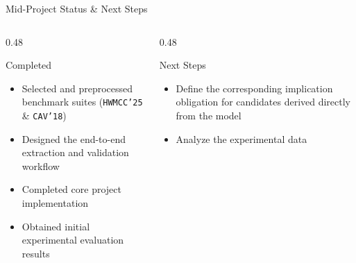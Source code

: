 \documentclass[aspectratio=169,xcolor=dvipsnames]{beamer}
\begin{document}
\begin{frame}{Mid-Project Status \& Next Steps}

  \begin{columns}[T,onlytextwidth]
    \begin{column}{0.48\textwidth}
      \begin{exampleblock}{Completed}
        \begin{itemize}
            \setlength\itemsep{0.4em}
          \item Selected and preprocessed benchmark suites (\texttt{HWMCC'25} \& \texttt{CAV'18})
          \item Designed the end-to-end extraction and validation workflow
          \item Completed core project implementation
          \item Obtained initial experimental evaluation results
        \end{itemize}
      \end{exampleblock}
    \end{column}

    \begin{column}{0.48\textwidth}
      \begin{block}{Next Steps}
        \begin{itemize}
            \setlength\itemsep{0.4em}
          \item Define the corresponding implication obligation for candidates derived directly from the model
          \item Analyze the experimental data
        \end{itemize}
      \end{block}
    \end{column}
  \end{columns}

\end{frame}
\end{document}
